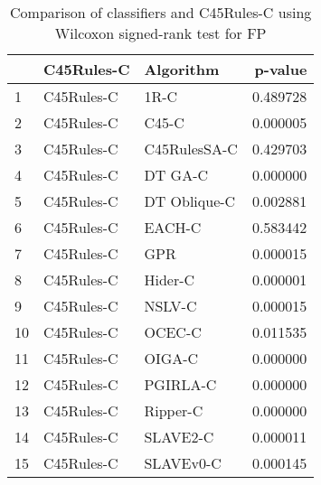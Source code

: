 \begin{table}
\footnotesize
\caption{Comparison of classifiers and C45Rules-C using Wilcoxon signed-rank test for FP}
\label{tab:C45Rules-C wilcoxon FP comparison}
\begin{tabular}{lllr}
\hline
 & C45Rules-C & Algorithm & p-value \\
\hline
1 & C45Rules-C & 1R-C & 0.489728 \\
2 & C45Rules-C & C45-C & 0.000005 \\
3 & C45Rules-C & C45RulesSA-C & 0.429703 \\
4 & C45Rules-C & DT GA-C & 0.000000 \\
5 & C45Rules-C & DT Oblique-C & 0.002881 \\
6 & C45Rules-C & EACH-C & 0.583442 \\
7 & C45Rules-C & GPR & 0.000015 \\
8 & C45Rules-C & Hider-C & 0.000001 \\
9 & C45Rules-C & NSLV-C & 0.000015 \\
10 & C45Rules-C & OCEC-C & 0.011535 \\
11 & C45Rules-C & OIGA-C & 0.000000 \\
12 & C45Rules-C & PGIRLA-C & 0.000000 \\
13 & C45Rules-C & Ripper-C & 0.000000 \\
14 & C45Rules-C & SLAVE2-C & 0.000011 \\
15 & C45Rules-C & SLAVEv0-C & 0.000145 \\
\hline
\end{tabular}
\end{table}
